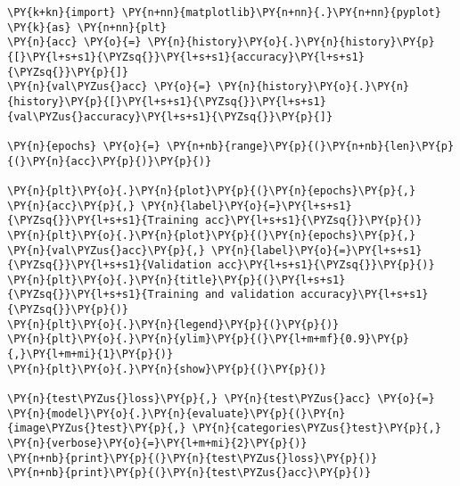     \begin{tcolorbox}[breakable, size=fbox, boxrule=1pt, pad at break*=1mm,colback=cellbackground, colframe=cellborder]
\begin{Verbatim}[commandchars=\\\{\}]
\PY{k+kn}{import} \PY{n+nn}{matplotlib}\PY{n+nn}{.}\PY{n+nn}{pyplot} \PY{k}{as} \PY{n+nn}{plt}
\PY{n}{acc} \PY{o}{=} \PY{n}{history}\PY{o}{.}\PY{n}{history}\PY{p}{[}\PY{l+s+s1}{\PYZsq{}}\PY{l+s+s1}{accuracy}\PY{l+s+s1}{\PYZsq{}}\PY{p}{]}
\PY{n}{val\PYZus{}acc} \PY{o}{=} \PY{n}{history}\PY{o}{.}\PY{n}{history}\PY{p}{[}\PY{l+s+s1}{\PYZsq{}}\PY{l+s+s1}{val\PYZus{}accuracy}\PY{l+s+s1}{\PYZsq{}}\PY{p}{]}

\PY{n}{epochs} \PY{o}{=} \PY{n+nb}{range}\PY{p}{(}\PY{n+nb}{len}\PY{p}{(}\PY{n}{acc}\PY{p}{)}\PY{p}{)}

\PY{n}{plt}\PY{o}{.}\PY{n}{plot}\PY{p}{(}\PY{n}{epochs}\PY{p}{,} \PY{n}{acc}\PY{p}{,} \PY{n}{label}\PY{o}{=}\PY{l+s+s1}{\PYZsq{}}\PY{l+s+s1}{Training acc}\PY{l+s+s1}{\PYZsq{}}\PY{p}{)}
\PY{n}{plt}\PY{o}{.}\PY{n}{plot}\PY{p}{(}\PY{n}{epochs}\PY{p}{,} \PY{n}{val\PYZus{}acc}\PY{p}{,} \PY{n}{label}\PY{o}{=}\PY{l+s+s1}{\PYZsq{}}\PY{l+s+s1}{Validation acc}\PY{l+s+s1}{\PYZsq{}}\PY{p}{)}
\PY{n}{plt}\PY{o}{.}\PY{n}{title}\PY{p}{(}\PY{l+s+s1}{\PYZsq{}}\PY{l+s+s1}{Training and validation accuracy}\PY{l+s+s1}{\PYZsq{}}\PY{p}{)}
\PY{n}{plt}\PY{o}{.}\PY{n}{legend}\PY{p}{(}\PY{p}{)}
\PY{n}{plt}\PY{o}{.}\PY{n}{ylim}\PY{p}{(}\PY{l+m+mf}{0.9}\PY{p}{,}\PY{l+m+mi}{1}\PY{p}{)}
\PY{n}{plt}\PY{o}{.}\PY{n}{show}\PY{p}{(}\PY{p}{)}

\PY{n}{test\PYZus{}loss}\PY{p}{,} \PY{n}{test\PYZus{}acc} \PY{o}{=} \PY{n}{model}\PY{o}{.}\PY{n}{evaluate}\PY{p}{(}\PY{n}{image\PYZus{}test}\PY{p}{,} \PY{n}{categories\PYZus{}test}\PY{p}{,} \PY{n}{verbose}\PY{o}{=}\PY{l+m+mi}{2}\PY{p}{)}
\PY{n+nb}{print}\PY{p}{(}\PY{n}{test\PYZus{}loss}\PY{p}{)}
\PY{n+nb}{print}\PY{p}{(}\PY{n}{test\PYZus{}acc}\PY{p}{)}
\end{Verbatim}
\end{tcolorbox}

